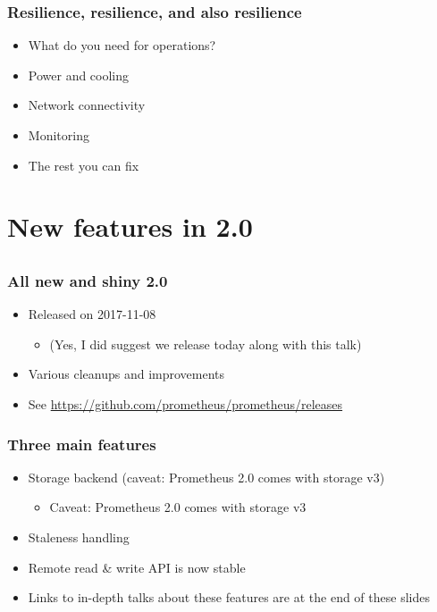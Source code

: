 \documentclass[t]{beamer}
\begin{document}
\begin{frame}
	\frametitle{Resilience, resilience, and also resilience}
	\begin{itemize}
		\item What do you need for operations?
		\item Power and cooling
		\item Network connectivity
		\item Monitoring
		\item The rest you can fix
	\end{itemize}
\end{frame}


\section{New features in 2.0}
\subsection{}

\begin{frame}
	\frametitle{All new and shiny 2.0}
	\begin{itemize}
		\item Released on 2017-11-08
		\begin{itemize}
			\item (Yes, I did suggest we release today along with this talk)
		\end{itemize}
		\item Various cleanups and improvements
		\item See \url{https://github.com/prometheus/prometheus/releases}
	\end{itemize}
\end{frame}

\begin{frame}
	\frametitle{Three main features}
	\begin{itemize}
		\item Storage backend (caveat: Prometheus 2.0 comes with storage v3)
		\begin{itemize}
			\item Caveat: Prometheus 2.0 comes with storage v3
		\end{itemize}
		\item Staleness handling
		\item Remote read \& write API is now stable
		\item Links to in-depth talks about these features are at the end of these slides
	\end{itemize}
\end{frame}
\end{document}

